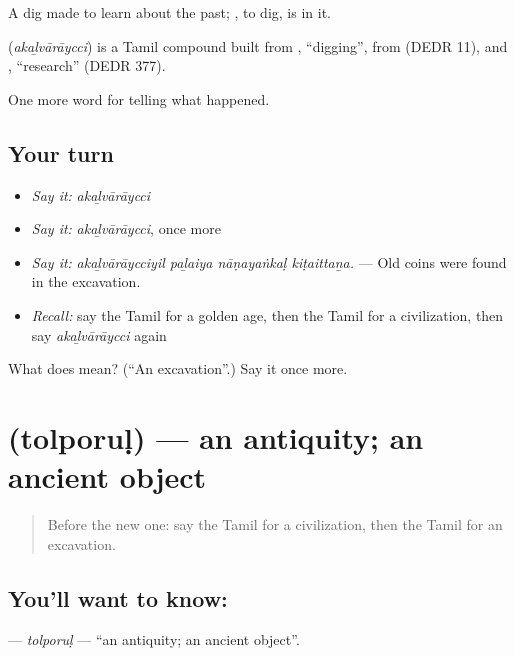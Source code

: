 A dig made to learn about the past; , to dig, is in it.

\begin{cousinweb}
\textbf{} (\emph{akaḻvārāycci}) is a Tamil compound built from , \textquotedblleft{}digging\textquotedblright{}, from  (DEDR 11), and , \textquotedblleft{}research\textquotedblright{} (DEDR 377).
\end{cousinweb}

\begin{grammarlens}[title={What you've built}]
One more word for telling what happened.
\end{grammarlens}

\subsection*{Your turn}
\begin{itemize}
\raggedright
  \item \emph{Say it:} \emph{akaḻvārāycci}
  \item \emph{Say it:} \emph{akaḻvārāycci}, once more
  \item \emph{Say it:} \emph{akaḻvārāycciyil paḻaiya nāṇayaṅkaḷ kiṭaittaṉa.} — Old coins were found in the excavation.
  \item \emph{Recall:} say the Tamil for a golden age, then the Tamil for a civilization, then say \emph{akaḻvārāycci} again
\end{itemize}

\begin{tcolorbox}[breakable,colback=teal!4,colframe=teal!35!black,title={Before you move on}]
What does  mean? (\textquotedblleft{}An excavation\textquotedblright{}.) Say it once more.
\end{tcolorbox}
\section[\texorpdfstring{\ta{தொல்பொருள்} (tolporuḷ)}{தொல்பொருள் (tolporuḷ)}]{ (tolporuḷ) — an antiquity; an ancient object}

\label{lesson:TA-C341-tolporul}



\begin{quote}
Before the new one: say the Tamil for a civilization, then the Tamil for an excavation.
\end{quote}

\subsection*{You'll want to know: }
\textbf{} — \emph{tolporuḷ} — \textquotedblleft{}an antiquity; an ancient object\textquotedblright{}.

